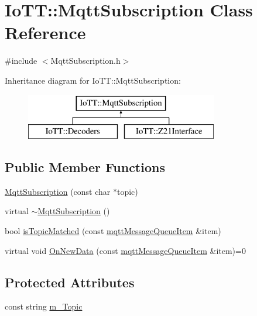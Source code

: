 \hypertarget{classIoTT_1_1MqttSubscription}{}\section{Io\+TT\+:\+:Mqtt\+Subscription Class Reference}
\label{classIoTT_1_1MqttSubscription}


{\ttfamily \#include $<$Mqtt\+Subscription.\+h$>$}

Inheritance diagram for Io\+TT\+:\+:Mqtt\+Subscription\+:\begin{figure}[H]
\begin{center}
\leavevmode
\includegraphics[height=2.000000cm]{classIoTT_1_1MqttSubscription}
\end{center}
\end{figure}
\subsection*{Public Member Functions}
\begin{DoxyCompactItemize}
\item 
\hyperlink{classIoTT_1_1MqttSubscription_a97c600c8bd24e69b5f9cc9a6bea767a7}{Mqtt\+Subscription} (const char $\ast$topic)
\item 
virtual \hyperlink{classIoTT_1_1MqttSubscription_a59507385afe48df7f1c5d3d509c3509e}{$\sim$\+Mqtt\+Subscription} ()
\item 
bool \hyperlink{classIoTT_1_1MqttSubscription_ad7e587fbdf5cf104f38c2c7e15a5b912}{is\+Topic\+Matched} (const \hyperlink{classIoTT_1_1mqttMessageQueueItem}{mqtt\+Message\+Queue\+Item} \&item)
\item 
virtual void \hyperlink{classIoTT_1_1MqttSubscription_a9ddc697ad6a842bd88ec0e768d8a1d37}{On\+New\+Data} (const \hyperlink{classIoTT_1_1mqttMessageQueueItem}{mqtt\+Message\+Queue\+Item} \&item)=0
\end{DoxyCompactItemize}
\subsection*{Protected Attributes}
\begin{DoxyCompactItemize}
\item 
const string \hyperlink{classIoTT_1_1MqttSubscription_a244de1721c3ba52f3920bee00fa7f73b}{m\+\_\+\+Topic}
\end{DoxyCompactItemize}


